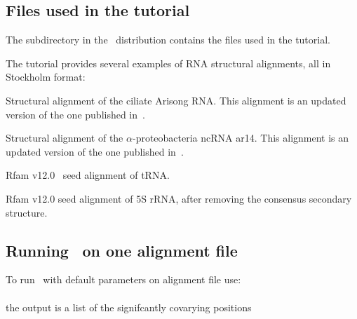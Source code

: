 \subsection{Files used in the tutorial}

The subdirectory  in the \rscape\ distribution contains the
files used in the tutorial. 

The tutorial provides several examples of RNA structural
alignments, all in Stockholm format:

\begin{sreitems}{}
\item[\emprog{updated\_Arisong.sto}] Structural alignment of the ciliate
  Arisong RNA. This alignment is an updated
  version of the one published in~\citep{JungEddy11}.
\item[\emprog{ar14.sto}] Structural alignment of the $\alpha$-proteobacteria ncRNA ar14. This alignment is an updated version of the one
  published in~\citep{delVal12}.
\item[\emprog{RF00005.sto}] Rfam v12.0~\citep{Nawrocki15} seed alignment of tRNA. 
\item[\emprog{RF00001-noss.sto}] Rfam v12.0 seed alignment of 5S rRNA, after removing the consensus secondary structure. 
\end{sreitems}


\subsection{Running \rscape\, on one alignment file}
To run \rscape\ with default parameters on alignment file
 use:\\

\\

\noindent
the output is a list of the signifcantly covarying positions

